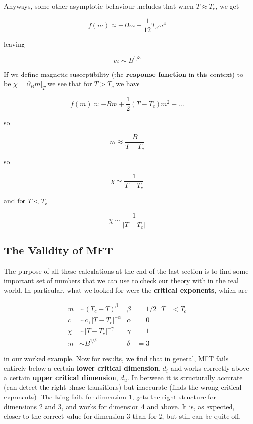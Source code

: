 \documentclass{article}
\theoremstyle{definition}
\begin{document}
Anyways, some other asymptotic behaviour includes that when $T \approx T_c$, we
get

$$ f(m) \approx -Bm + \frac{1}{12} T_c m^4 $$

leaving

$$ m \sim B^{1/3} $$

If we define magnetic susceptibility (the \textbf{response function} in this
context) to be $\chi = \partial_B m|_T$ we see that for $T > T_c$ we have

$$ f(m) \approx -Bm + \frac{1}{2} (T - T_c) m^2 + \dots $$

so

$$ m \approx \frac{B}{T - T_c} $$

so

$$ \chi \sim \frac{1}{T - T_c} $$

and for $T < T_c$

$$ \chi \sim \frac{1}{|T - T_c|} $$

\subsection{The Validity of MFT}

The purpose of all these calculations at the end of the last section is to find
some important set of numbers that we can use to check our theory with in the
real world. In particular, what we looked for were the \textbf{critical
  exponents}, which are

\begin{align*}
  m &\sim (T_c - T)^\beta & \beta &= 1/2 & T &< T_c \\
  c &\sim c_\pm |T - T_c|^{-\alpha} & \alpha &= 0 && \\
  \chi &\sim |T - T_c|^{-\gamma} & \gamma &= 1 && \\
  m &\sim B^{1/\delta} & \delta &= 3 &&
\end{align*}

in our worked example. Now for results, we find that in general, MFT fails
entirely below a certain \textbf{lower critical dimension}, $d_i$ and works correctly
above a certain \textbf{upper critical dimension}, $d_u$. In between it is structurally
accurate (can detect the right phase transitions) but inaccurate (finds the
wrong critical exponents). The Ising fails for dimension 1, gets the right
structure for dimensions 2 and 3, and works for dimension 4 and above. It is, as
expected, closer to the correct value for dimension 3 than for 2, but still can
be quite off.
\end{document}
